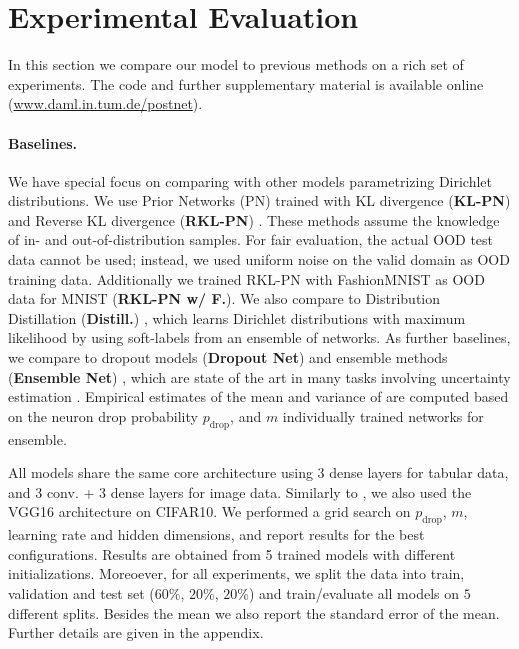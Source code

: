 \section{Experimental Evaluation}
\label{sec:experiments_006}

In this section we compare our model to previous methods on a rich set of experiments. The code and further supplementary material is available online (\url{www.daml.in.tum.de/postnet}).

\paragraph{Baselines.} We have special focus on comparing with other models parametrizing Dirichlet distributions. We use Prior Networks (PN) trained with KL divergence (\textbf{KL-PN}) \cite{PriorNetworks} and Reverse KL divergence (\textbf{RKL-PN}) \cite{reverse-kl}. These methods assume the knowledge of in- and out-of-distribution samples. For fair evaluation, the actual OOD test data cannot be used; instead, we used uniform noise on the valid domain as OOD training data. Additionally we trained RKL-PN with FashionMNIST as OOD data for MNIST (\textbf{RKL-PN w/ F.}). We also compare to Distribution Distillation (\textbf{Distill.}) \cite{distribution-distillation}, which learns Dirichlet distributions with maximum likelihood by using soft-labels from an ensemble of networks. 
As further baselines, we compare to dropout models (\textbf{Dropout Net}) \cite{dropout} and ensemble methods (\textbf{Ensemble Net}) \cite{ensembles}, which are state of the art in many tasks involving uncertainty estimation \cite{dataset-shift}. Empirical estimates of the mean and variance of  are computed based on the neuron drop probability $p_{\text{drop}}$, and $m$ individually trained networks for ensemble.

All models share the same core architecture using 3 dense layers for tabular data, and 3 conv. + 3 dense layers for image data. Similarly to \cite{PriorNetworks, reverse-kl}, we also used the VGG16 architecture \cite{vgg} on CIFAR10. We performed a grid search on $p_{\text{drop}}$, $m$, learning rate and hidden dimensions, and report results for the best configurations. Results are obtained from 5 trained models with different initializations.
Moreoever, for all experiments, we split the data into train, validation and test set  ($60\%$, $20\%$, $20\%$) and train/evaluate all models on $5$ different splits. Besides the mean we also report the standard error of the mean. Further details are given in the appendix.

